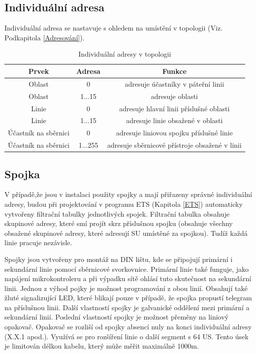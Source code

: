 \newpage
\subsection{Individuální adresa}
Individuální adresa se nastavuje s ohledem na umístění v topologii (Viz. Podkapitola \ref{Adresování}).
\begin{table}[h]
 \caption[Individuální adresy v topologii \cite{Topologie}]{Individuální adresy v topologii \cite{Topologie}}
   \small
    \centering
	  \begin{tabular}{|c|c|c|}
	    \hline
	    Prvek & Adresa & Funkce  \\
	    \hline\hline
	    Oblast & 0 & adresuje účastníky v páteřní linii \\
	    \hline
	    Oblast & 1...15 & adresuje oblasti \\
	    \hline
	    Linie & 0 & adresuje hlavní linii příslušné oblasti \\
	    \hline
	    Linie & 1...15 & adresuje linie obsažené v oblasti\\ 
	    \hline
	    Účastník na sběrnici & 0 & adresuje liniovou spojku příslušné linie \\
	    \hline
	    Účastník na sběrnici & 1...255 & adresuje sběrnicové přístroje obsažené v linii \\
	    \hline
	  \end{tabular}
\end{table}
\newpage
\subsection{Spojka}
V případě,že jsou v instalaci použity spojky a mají přiřazeny správné individuální adresy, budou při projektování v programu ETS (Kapitola \ref{ETS}) automaticky vytvořeny filtrační tabulky jednotlivých spojek. Filtrační tabulka obsahuje skupinové adresy, které smí projít skrz příslušnou spojku (obsahuje všechny obsažené skupinové adresy, které adresují SU umístěné za spojkou). Tudíž každá linie pracuje nezávisle.

 Spojky jsou vytvořeny pro montáž na DIN lištu, kde se připojují primární i sekundární linie pomocí sběrnicové svorkovnice. Primární linie také funguje, jako napájení mikrokontroleru a při výpadku sítě ohlásí tuto skutečnost na sekundární linii. Jednou z výhod pojky je možnost programování z obou linií. Obsahují také žluté signalizující LED, které blikají pouze v případě, že spojka propustí telegram na příslušnou linii. Další vlastností spojky je galvanické oddělení mezi primární a sekundární linií. Poslední vlastností spojky je možnost přeměny na liniový opakovač. Opakovač se rozliší od spojky absencí nuly na konci individuální adresy (X.X.1 apod.). Využívá se pro rozšíření linie o další segment s 64 US. Tento úsek je limitován délkou kabelu, který může měřit maximálně 1000m. \cite{Topologie}
 
